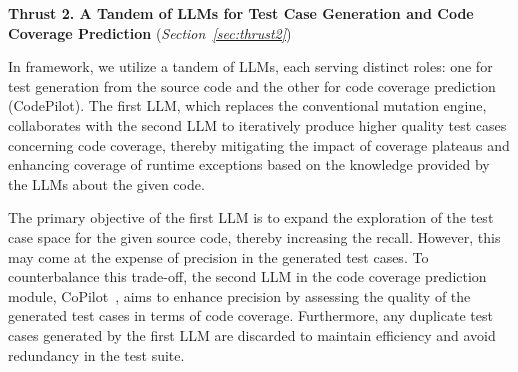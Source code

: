 
\vspace{3pt}
\noindent \textbf{Thrust 2. A Tandem of LLMs for Test Case Generation and Code Coverage Prediction}  ({\em Section~\ref{sec:thrust2}})

In framework, we utilize a tandem of LLMs, each serving distinct
roles: one for test generation from the source code and the other for
code coverage prediction (CodePilot). The first LLM, which replaces
the conventional mutation engine, collaborates with the second LLM to
iteratively produce higher quality test cases concerning code
coverage, thereby mitigating the impact of coverage plateaus and
enhancing coverage of runtime exceptions based on the knowledge
provided by the LLMs about the given code.

The primary objective of the first LLM is to expand the exploration of
the test case space for the given source code, thereby increasing the
recall. However, this may come at the expense of precision in the
generated test cases. To counterbalance this trade-off, the second LLM
in the code coverage prediction module, CoPilot~\cite{forge24}, aims to
enhance precision by assessing the quality of the generated test cases
in terms of code coverage. Furthermore, any duplicate test cases
generated by the first LLM are discarded to maintain efficiency and
avoid redundancy in the test suite.




